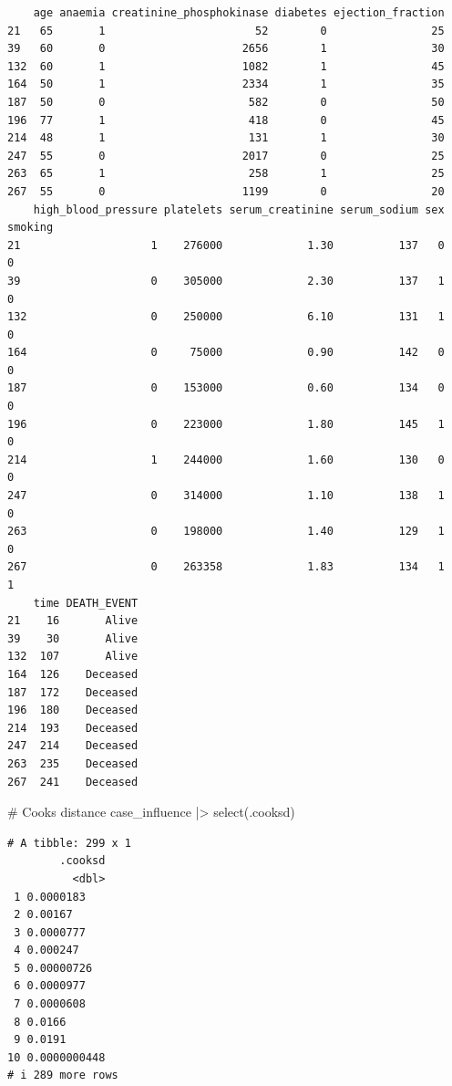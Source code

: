\documentclass[
  letterpaper,
  DIV=11,
  numbers=noendperiod]{scrartcl}
\newenvironment{Shaded}{\begin{snugshade}}{\end{snugshade}}
\newcommand{\CommentTok}[1]{\textcolor[rgb]{0.37,0.37,0.37}{#1}}
\newcommand{\FunctionTok}[1]{\textcolor[rgb]{0.28,0.35,0.67}{#1}}
\newcommand{\NormalTok}[1]{\textcolor[rgb]{0.00,0.23,0.31}{#1}}
\newcommand{\SpecialCharTok}[1]{\textcolor[rgb]{0.37,0.37,0.37}{#1}}
\begin{document}
\begin{verbatim}
    age anaemia creatinine_phosphokinase diabetes ejection_fraction
21   65       1                       52        0                25
39   60       0                     2656        1                30
132  60       1                     1082        1                45
164  50       1                     2334        1                35
187  50       0                      582        0                50
196  77       1                      418        0                45
214  48       1                      131        1                30
247  55       0                     2017        0                25
263  65       1                      258        1                25
267  55       0                     1199        0                20
    high_blood_pressure platelets serum_creatinine serum_sodium sex smoking
21                    1    276000             1.30          137   0       0
39                    0    305000             2.30          137   1       0
132                   0    250000             6.10          131   1       0
164                   0     75000             0.90          142   0       0
187                   0    153000             0.60          134   0       0
196                   0    223000             1.80          145   1       0
214                   1    244000             1.60          130   0       0
247                   0    314000             1.10          138   1       0
263                   0    198000             1.40          129   1       0
267                   0    263358             1.83          134   1       1
    time DEATH_EVENT
21    16       Alive
39    30       Alive
132  107       Alive
164  126    Deceased
187  172    Deceased
196  180    Deceased
214  193    Deceased
247  214    Deceased
263  235    Deceased
267  241    Deceased
\end{verbatim}

\begin{Shaded}
\begin{Highlighting}[]
\CommentTok{\# Cook\textquotesingle{}s distance}
\NormalTok{case\_influence }\SpecialCharTok{|\textgreater{}} \FunctionTok{select}\NormalTok{(.cooksd)}
\end{Highlighting}
\end{Shaded}

\begin{verbatim}
# A tibble: 299 x 1
        .cooksd
          <dbl>
 1 0.0000183   
 2 0.00167     
 3 0.0000777   
 4 0.000247    
 5 0.00000726  
 6 0.0000977   
 7 0.0000608   
 8 0.0166      
 9 0.0191      
10 0.0000000448
# i 289 more rows
\end{verbatim}
\end{document}
